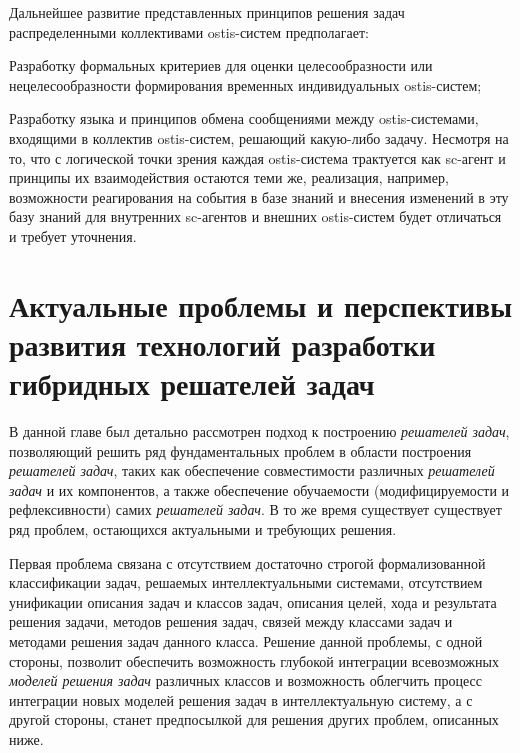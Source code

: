 Дальнейшее развитие представленных принципов решения задач распределенными коллективами ostis-систем предполагает:
\begin{textitemize}
	\item Разработку формальных критериев для оценки целесообразности или нецелесообразности формирования временных индивидуальных ostis-систем;
	\item Разработку языка и принципов обмена сообщениями между ostis-системами, входящими в коллектив ostis-систем, решающий какую-либо задачу. Несмотря на то, что с логической точки зрения каждая ostis-система трактуется как sc-агент и принципы их взаимодействия остаются теми же, реализация, например, возможности реагирования на события в базе знаний и внесения изменений в эту базу знаний для внутренних sc-агентов и внешних ostis-систем будет отличаться и требует уточнения.
\end{textitemize}

\section{Актуальные проблемы и перспективы развития технологий разработки гибридных решателей задач}
\label{sec_ps_future}

В данной главе был детально рассмотрен подход к построению \textit{решателей задач}, позволяющий решить ряд фундаментальных проблем в области построения \textit{решателей задач}, таких как обеспечение совместимости различных \textit{решателей задач} и их компонентов, а также обеспечение обучаемости (модифицируемости и рефлексивности) самих \textit{решателей задач}. В то же время существует существует ряд проблем, остающихся актуальными и требующих решения.

Первая проблема связана с отсутствием достаточно строгой формализованной классификации задач, решаемых интеллектуальными системами, отсутствием унификации описания задач и классов задач, описания целей, хода и результата решения задачи, методов решения задач, связей между классами задач и методами решения задач данного класса. Решение данной проблемы, с одной стороны, позволит обеспечить возможность глубокой интеграции всевозможных \textit{моделей решения задач} различных классов и возможность облегчить процесс интеграции новых моделей решения задач в интеллектуальную систему, а с другой стороны, станет предпосылкой для решения других проблем, описанных ниже.

